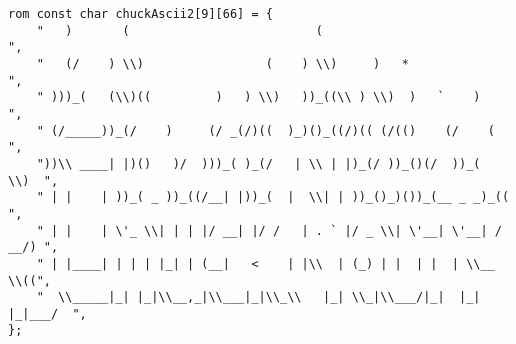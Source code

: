 \begin{lstlisting}
rom const char chuckAscii2[9][66] = {
	"   )       (                          (                          ",
	"   (/    ) \\)                 (    ) \\)     )   *                ",
	" )))_(   (\\)((         )   ) \\)   ))_((\\ ) \\)  )   `    )        ",
	" (/_____))_(/    )     (/ _(/)((  )_)()_((/)(( (/(()    (/    (  ",
	"))\\ ____| |)()   )/  )))_( )_(/   | \\ | |)_(/ ))_()(/  ))_(  \\)  ",
	" | |    | ))_( _ ))_((/__| |))_(  |  \\| | ))_()_)())_(__ _ _)_(( ",
	" | |    | \'_ \\| | | |/ __| |/ /   | . ` |/ _ \\| \'__| \'__| / __/) ",
	" | |____| | | | |_| | (__|   <    | |\\  | (_) | |  | |  | \\__ \\((",
	"  \\_____|_| |_|\\__,_|\\___|_|\\_\\   |_| \\_|\\___/|_|  |_|  |_|___/  ",
};


\end{lstlisting}
